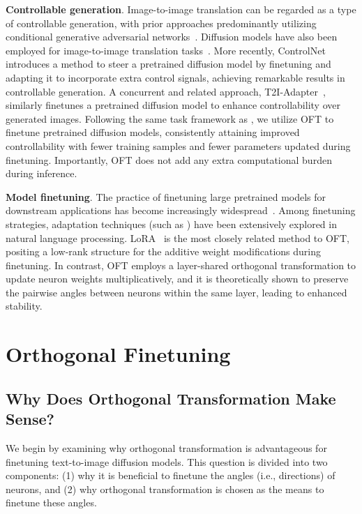 \textbf{Controllable generation}. Image-to-image translation can be regarded as a type of controllable generation, with prior approaches predominantly utilizing conditional generative adversarial networks~\cite{isola2017image,zhu2017toward,wang2018high,park2019semantic,choi2018stargan}. Diffusion models have also been employed for image-to-image translation tasks~\cite{saharia2022palette,voynov2022sketch,wang2022pretraining}. More recently, ControlNet~\cite{zhang2023adding} introduces a method to steer a pretrained diffusion model by finetuning and adapting it to incorporate extra control signals, achieving remarkable results in controllable generation. A concurrent and related approach, T2I-Adapter~\cite{mou2023t2i}, similarly finetunes a pretrained diffusion model to enhance controllability over generated images. Following the same task framework as \cite{zhang2023adding,mou2023t2i}, we utilize OFT to finetune pretrained diffusion models, consistently attaining improved controllability with fewer training samples and fewer parameters updated during finetuning. Importantly, OFT does not add any extra computational burden during inference.

\textbf{Model finetuning}. The practice of finetuning large pretrained models for downstream applications has become increasingly widespread~\cite{devlin2018bert,brown2020language,he2022masked}. Among finetuning strategies, adaptation techniques (such as \cite{hulora2022,houlsby2019parameter,pfeiffer2020adapterfusion}) have been extensively explored in natural language processing. LoRA~\cite{hulora2022} is the most closely related method to OFT, positing a low-rank structure for the additive weight modifications during finetuning. In contrast, OFT employs a layer-shared orthogonal transformation to update neuron weights multiplicatively, and it is theoretically shown to preserve the pairwise angles between neurons within the same layer, leading to enhanced stability.

\section{Orthogonal Finetuning}

\subsection{Why Does Orthogonal Transformation Make Sense?}

We begin by examining why orthogonal transformation is advantageous for finetuning text-to-image diffusion models. This question is divided into two components: (1) why it is beneficial to finetune the angles (i.e., directions) of neurons, and (2) why orthogonal transformation is chosen as the means to finetune these angles.


